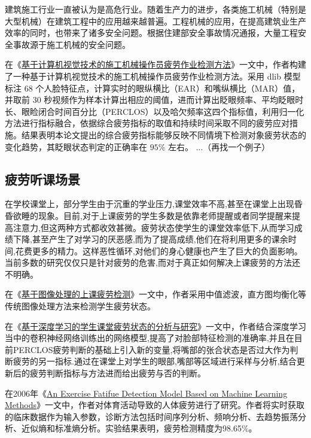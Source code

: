 建筑施工行业一直被认为是高危行业。随着生产力的进步，各类施工机械（特别是大型机械）在建筑工程中的应用越来越普遍。工程机械的应用，在提高建筑业生产效率的同时，也带来了诸多安全问题。根据住建部安全事故情况通报，大量工程安全事故源于施工机械的安全问题。

在《\href{https://kns.cnki.net/kcms/detail/11.5823.tu.20210201.1703.039.html}{基于计算机视觉技术的施工机械操作员疲劳作业检测方法}》一文中，作者构建了一种基于计算机视觉技术的施工机械操作员疲劳作业检测方法。采用 dlib 模型标注 68 个人脸特征点，计算实时的眼纵横比（EAR）和嘴纵横比（MAR）值，并取前 30 秒视频作为样本计算出相应的阈值，进而计算出眨眼频率、平均眨眼时长、眼睑闭合时间百分比（PERCLOS）以及哈欠频率这四个指标值，利用归一化方法进行指标融合，依据综合疲劳指标的取值和持续时间采取不同的疲劳应对措施。结果表明本论文提出的综合疲劳指标能够反映不同情境下检测对象疲劳状态的变化趋势，其眨眼状态判定的正确率在 $95\%$ 左右。
...（再找一个例子）

\subsection{疲劳听课场景}

在学校课堂上，部分学生由于沉重的学业压力,课堂效率不高,甚至在课堂上出现昏昏欲睡的现象。目前,对于上课疲劳的学生多数是依靠老师提醒或者同学提醒来提高注意力,但这两种方式都收效甚微。疲劳状态使学生的课堂效率低下,从而学习成绩下降,甚至产生了对学习的厌恶感,而为了提高成绩,他们在将利用更多的课余时间,花费更多的精力。这样恶性循环,对他们的身心健康也产生了巨大的负面影响。当前多数的研究仅仅只是针对疲劳的危害,而对于真正如何解决上课疲劳的方法还不明确。

在《\href{https://xueshu.baidu.com/usercenter/paper/show?paperid=1q1y04j09m4y0xu0we0c0mf0fk289643&site=xueshu_se}{基于图像处理的上课疲劳检测}》一文中，作者采用中值滤波，直方图均衡化等传统图像处理方法来检测学生疲劳状态。

在《\href{https://xueshu.baidu.com/usercenter/paper/show?paperid=190t08j0my790eb0rr7c0g90xf140982&site=xueshu_se}{基于深度学习的学生课堂疲劳状态的分析与研究}》一文中，作者结合深度学习当中的卷积神经网络训练出的网络模型,提高了对脸部特征检测的准确率,并且在目前PERCLOS疲劳判断的基础上引入新的变量,将嘴部的张合状态是否过大作为判断疲劳的另一指标.通过在课堂上对学生的眼部,嘴部等区域进行采样与分析,结合更新后的疲劳判断指标与方法进而给出疲劳与否的判断。

在2006年《\href{https://arxiv.org/ftp/arxiv/papers/1803/1803.07952.pdf}{An Exercise Fatifue
Detection Model Based on Machine Learning Methods}》一文中，作者对体育活动导致的人体疲劳进行了研究。作者将实时获取的临床数据作为输入参数，诊断方法包括时间序列分析、频响分析、去趋势振荡分析、近似熵和标准熵分析。实验结果表明，疲劳检测精度为98.65$\%$。


